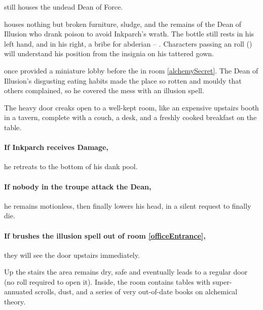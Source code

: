 \null
\setcounter{enumi}{\value{list}}
\begin{list}{Room\space{}.\space}{}
  \item
  still houses the undead Dean of Force.
  \label{deanRoom}
  \item
  houses nothing but broken furniture, sludge, and the remains of the Dean of Illusion who drank poison to avoid Inkparch's wrath.
  The bottle still rests in his left hand, and in his right, a bribe for \gls{abderian} -- \lootBig.
  Characters passing an  roll (\tn[13]) will understand his position from the insignia on his tattered gown.
  \label{deadIllusionist}
  \item
  once provided a miniature lobby before the  in room \ref{alchemySecret}.
  The Dean of Illusion's disgusting eating habits made the place so rotten and mouldy that others complained, so he covered the mess with an illusion \gls{spell}.
  \label{officeEntrance}
  \begin{boxtext}
    The heavy door creaks open to a well-kept room, like an expensive upstairs booth in a tavern, complete with a couch, a desk, and a freshly cooked breakfast on the table.
  \end{boxtext}
\end{list}

\paragraph{If Inkparch receives Damage,}
he retreats to the bottom of his dank pool.

\paragraph{If nobody in the troupe attack the Dean,}
he remains motionless, then finally lowers his head, in a silent request to finally die.

\paragraph{If  brushes the illusion \gls{spell} out of room \ref{officeEntrance},}
they will see the door upstairs immediately.


Up the stairs the area remains dry, safe and eventually leads to a regular door (no roll required to open it).
Inside, the room contains tables with super-annuated scrolls, dust, and a series of very out-of-date books on alchemical theory.

